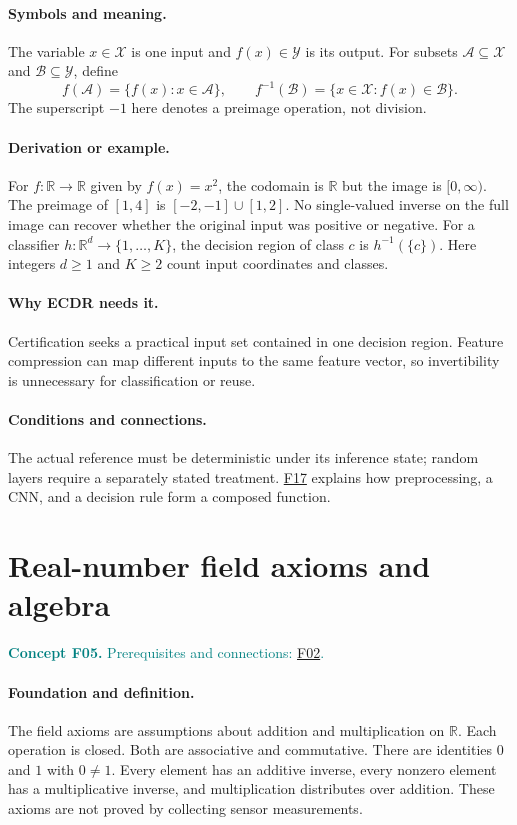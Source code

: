 \documentclass[11pt,a4paper]{article}
\newcommand{\R}{\mathbb R}
\newcommand{\conceptid}{Front matter}
\newcommand{\concept}[3]{\clearpage\renewcommand{\conceptid}{#1}%
\section{#2}\label{concept:#1}%
\textcolor{teal}{\textbf{Concept #1.} Prerequisites and connections: #3.}\par
\typeout{ECDR-CONCEPT-START #1 PAGE=\thepage}}
\begin{document}
\paragraph{Symbols and meaning.}
The variable $x\in\mathcal X$ is one input and $f(x)\in\mathcal Y$
is its output. For subsets $\mathcal A\subseteq\mathcal X$ and
$\mathcal B\subseteq\mathcal Y$, define
\[
 f(\mathcal A)=\{f(x):x\in\mathcal A\},\qquad
 f^{-1}(\mathcal B)=\{x\in\mathcal X:f(x)\in\mathcal B\}.
\]
The superscript $-1$ here denotes a preimage operation, not division.
\paragraph{Derivation or example.}
For $f:\R\to\R$ given by $f(x)=x^2$, the codomain is $\R$ but
the image is $[0,\infty)$. The preimage of $[1,4]$ is
$[-2,-1]\cup[1,2]$. No single-valued inverse on the full image can
recover whether the original input was positive or negative.
For a classifier $h:\R^{d}\to\{1,\ldots,K\}$, the decision region
of class $c$ is $h^{-1}(\{c\})$. Here integers $d\ge1$ and $K\ge2$
count input coordinates and classes.
\paragraph{Why ECDR needs it.}
Certification seeks a practical input set contained in one decision
region. Feature compression can map different inputs to the same feature
vector, so invertibility is unnecessary for classification or reuse.
\paragraph{Conditions and connections.}
The actual reference must be deterministic under its inference state;
random layers require a separately stated treatment. \hyperref[concept:F17]{F17} explains how
preprocessing, a CNN, and a decision rule form a composed function.
\par\label{endconcept:F04}

\concept{F05}{Real-number field axioms and algebra}{\hyperref[concept:F02]{F02}}
\paragraph{Foundation and definition.}
The field axioms are assumptions about addition and multiplication on
$\R$. Each operation is closed. Both are associative and commutative.
There are identities $0$ and $1$ with $0\ne1$. Every element has an
additive inverse, every nonzero element has a multiplicative inverse, and
multiplication distributes over addition. These axioms are not proved
by collecting sensor measurements.
\end{document}
